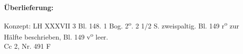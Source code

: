       
               
                \begin{ledgroupsized}[r]{120mm}
                \footnotesize 
                \pstart                
                \noindent\textbf{\"{U}berlieferung:}   
                \pend
                \end{ledgroupsized}
            
              
                            \begin{ledgroupsized}[r]{114mm}
                            \footnotesize 
                            \pstart \parindent -6mm
                            Konzept: LH XXXVII 3 Bl. 148. 1 Bog. 2\textsuperscript{o}. 2 1/2 S. zweispaltig. Bl. 149 r\textsuperscript{o} zur H\"{a}lfte beschrieben, Bl. 149 v\textsuperscript{o} leer.\\Cc 2, Nr. 491 F \pend
                            \end{ledgroupsized}
                \vspace*{8mm}
                \pstart 
                \normalsize
